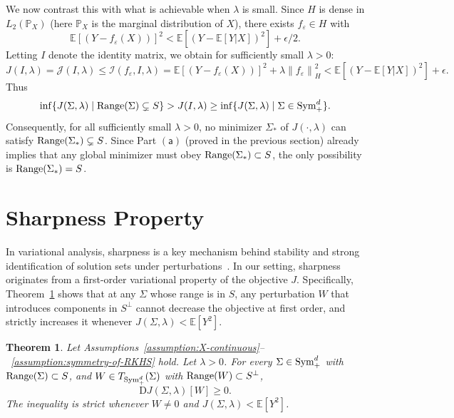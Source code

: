 \documentclass[sn-mathphys-num]{sn-jnl}%
\numberwithin{equation}{section}
\newcommand{\E}{\mathbb{E}}
\newcommand{\norm}[1]{\left\|{#1}\right\|} %
\renewcommand{\P}{\mathbb{P}}
\newcommand{\eps}{\epsilon}
\newcommand{\Range}{{\rm Range}}
\newcommand{\Sym}{{\rm \mathrm{Sym}}}
\theoremstyle{thmstyleone}%
\newtheorem{theorem}{Theorem}%
\theoremstyle{thmstyletwo}%
\theoremstyle{thmstylethree}%
\begin{document}
We now contrast this with what is achievable when $\lambda$ is small. Since $H$ is dense in $L_2(\P_X)$ (here
$\P_X$ is the marginal distribution of $X$), there exists $f_\varepsilon\in H$ with
\begin{equation*}
	\E[(Y-f_\varepsilon (X))]^2 < \E[(Y - \E[Y|X])^2] + \eps/2.
\end{equation*}
Letting $I$ denote the identity matrix, we obtain for sufficiently small $\lambda>0$:
\begin{equation*}
	J(I, \lambda) = \mathcal{J}(I, \lambda) \le 
		\mathcal{I} (f_\varepsilon, I, \lambda) = \E[(Y-f_\varepsilon (X))]^2 + \lambda \norm{f_\varepsilon}_H^2 < 
		\E[(Y - \E[Y|X])^2] + \eps.
\end{equation*}
Thus
\begin{equation*}
	\inf \{J(\Sigma, \lambda) \mid \Range(\Sigma) \subsetneq S \} >  J(I, \lambda) \ge 
		 \inf \{J(\Sigma, \lambda) \mid \Sigma \in \Sym_+^{d} \}.
\end{equation*} 
Consequently, for all sufficiently small $\lambda > 0$, no minimizer $\Sigma_*$ of $J(\cdot,\lambda)$ can satisfy $\Range(\Sigma_*) \subsetneq S$. Since Part $\mathsf{(a)}$ (proved in the previous section) already implies that any global minimizer must obey $\Range(\Sigma_*) \subset S$, the only possibility is $\Range(\Sigma_*) = S$.



\newcommand{\proj}{\Pi}
\newcommand{\tangent}{\mathcal{T}}
\newcommand{\tr}{{tr}}
\section{Sharpness Property}
\label{sec:sharpness-property}
\indent\indent
In variational analysis, sharpness is a key mechanism behind stability and strong identification of solution sets 
under perturbations~\cite{RockafellarTyWe98, Lewis02}. In our setting, sharpness originates from a first-order variational property of the objective $J$.
Specifically, Theorem~\ref{theorem:sharpness-general} shows that at any $\Sigma$ whose range is
 in $S$, any perturbation $W$ that introduces components in $S^\perp$ cannot decrease 
 the objective at first order, and strictly increases it whenever $J(\Sigma, \lambda) < \E[Y^2]$.


\vspace{.5em} 
\begin{theorem}
\label{theorem:sharpness-general} 
Let Assumptions~\ref{assumption:X-continuous}--~\ref{assumption:symmetry-of-RKHS} 
hold. Let $\lambda > 0$. 
For every $\Sigma \in \Sym_+^d$ with $\Range(\Sigma) \subset S$, and $W \in T_{\Sym_+^d}(\Sigma)$ with $\Range(W) \subset S^\perp$, 
\begin{equation*}
	\mathrm{D} J(\Sigma, \lambda)[W] \ge 0.
\end{equation*}
The inequality is strict whenever $W \neq 0$ and $J(\Sigma, \lambda) < \E[Y^2]$. 
\end{theorem} 
\end{document}
